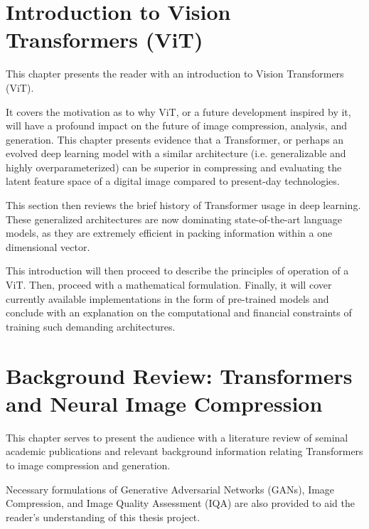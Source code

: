 \documentclass[pdftex,11pt,titlepage,twoside,openright]{report}
\begin{document}
\setcounter{page}{1}



\chapter{Introduction to Vision Transformers (ViT)}


This chapter presents the reader with an introduction to Vision Transformers (ViT).

It covers the motivation as to why ViT, or a future development inspired by it,
will have a profound impact on the future of image compression, analysis, and generation.
This chapter presents evidence that a Transformer, or perhaps an evolved deep learning model with a
similar architecture (i.e. generalizable and highly overparameterized) can be superior in
compressing and evaluating the latent feature space of a digital image compared to present-day
technologies.

This section then reviews the brief history of Transformer usage in deep learning.
These generalized architectures are now dominating state-of-the-art language models,
as they are extremely efficient in packing information within a one dimensional vector.

This introduction will then proceed to describe the principles of operation of a ViT. 
Then, proceed with a mathematical formulation. Finally, it will cover currently 
available implementations in the form of pre-trained models and conclude with an 
explanation on the computational and financial constraints of training such demanding 
architectures.

\ThinHRule

\newpage



\chapter{Background Review: Transformers and Neural Image Compression}


This chapter serves to present the audience with a literature review of seminal academic
publications and relevant background information relating Transformers to image 
compression and generation.

Necessary formulations of Generative Adversarial Networks (GANs),
Image Compression, and Image Quality Assessment (IQA)
are also provided to aid the reader's understanding of this thesis project.
\end{document}
